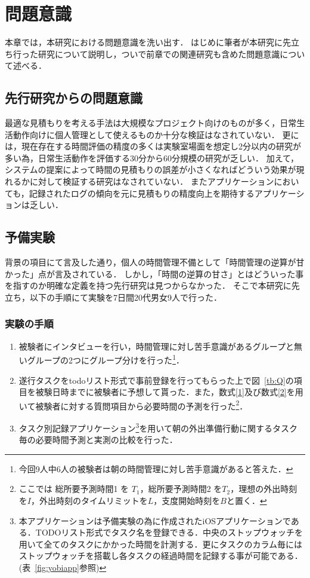 \chapter{問題意識}
本章では，本研究における問題意識を洗い出す．
はじめに筆者が本研究に先立ち行った研究について説明し，ついで前章での関連研究も含めた問題意識について述べる．

\section{先行研究からの問題意識}
最適な見積もりを考える手法は大規模なプロジェクト向けのものが多く，日常生活動作向けに個人管理として使えるものか十分な検証はなされていない．
更には，現在存在する時間評価の精度の多くは実験室場面を想定し2分以内の研究が多い為，日常生活動作を評価する30分から60分規模の研究が乏しい．
加えて，システムの提案によって時間の見積もりの誤差が小さくなればどういう効果が現れるかに対して検証する研究はなされていない．
またアプリケーションにおいても，記録されたログの傾向を元に見積もりの精度向上を期待するアプリケーションは乏しい．

\section{予備実験}
背景の項目にて言及した通り，個人の時間管理不備として「時間管理の逆算が甘かった」点が言及されている．
しかし，「時間の逆算の甘さ」とはどういった事を指すのか明確な定義を持つ先行研究は見つからなかった．
そこで本研究に先立ち，以下の手順にて実験を7日間20代男女9人で行った．
\subsection{実験の手順}
\begin{enumerate}

  \item 被験者にインタビューを行い，時間管理に対し苦手意識があるグループと無いグループの2つにグループ分けを行った\footnote{今回9人中6人の被験者は朝の時間管理に対し苦手意識があると答えた．}．

  \item 遂行タスクをtodoリスト形式で事前登録を行ってもらった上で図~\ref{tb:Q}の項目を被験日時までに被験者に予想して貰った．また，数式\ref{1}及び数式\ref{2}を用いて被験者に対する質問項目から必要時間の予測を行った\footnote{ここでは 総所要予測時間1 を $T_{1}$，総所要予測時間2 を$T_{2}$，理想の外出時刻を$I$，外出時刻のタイムリミットを$L$，支度開始時刻を$B$と置く．}．
  
  \item タスク別記録アプリケーション\footnote{本アプリケーションは予備実験の為に作成されたiOSアプリケーションである．TODOリスト形式でタスク名を登録できる．中央のストップウォッチを用いて全てのタスクにかかった時間を計測する．更にタスクのカラム毎にはストップウォッチを搭載し各タスクの経過時間を記録する事が可能である．(表~\ref{fig:yobiapp}参照)}を用いて朝の外出準備行動に関するタスク毎の必要時間予測と実測の比較を行った．
  
\end{enumerate}

